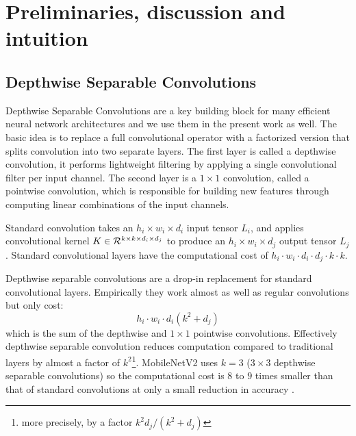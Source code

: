 \documentclass[10pt,twocolumn,letterpaper]{article}
\def\real{{\cal R}}
\begin{document}
\section{Preliminaries, discussion and intuition}

\subsection{Depthwise Separable Convolutions}
Depthwise Separable Convolutions are a key building block for many efficient neural network architectures \cite{MobilenetV1,Chollet_2017_CVPR,ShuffleNet2017} and we use them in the present work as well.
The basic idea is to replace a full convolutional operator with a factorized version that splits convolution into two separate layers.
The first layer is called a depthwise convolution, it performs lightweight filtering by applying a single convolutional filter per input channel.
The second layer is a $1 \times 1$ convolution, called a pointwise convolution, which is responsible for building new features through computing linear combinations of the input channels. 

Standard convolution takes an $h_i\times w_i\times d_i$ input tensor $L_i$, and applies convolutional  kernel $K\in \real^{k\times k \times d_i \times d_j}$ to produce an $h_i\times w_i\times d_j$ output tensor $L_j$.
Standard convolutional layers have the computational cost of $h_i \cdot w_i \cdot d_i \cdot d_j \cdot k \cdot k$. %

Depthwise separable convolutions are a drop-in replacement for standard convolutional layers.
Empirically they work almost as well as regular convolutions but only cost:
\begin{equation}  
  h_i \cdot w_i \cdot d_i (k^2 + d_j)
  \label{eq:depthwise}
\end{equation}
which is the sum of the depthwise and $1 \times 1$ pointwise convolutions.
Effectively depthwise separable convolution reduces computation compared to traditional layers by almost a factor of $k^2$\footnote{more precisely, by a factor $k^2 d_j/(k^2 + d_j)$}.
\mbox{MobileNetV2} uses $k=3$ ($3 \times 3$ depthwise separable convolutions) so the computational cost is $8$ to $9$ times smaller than that of standard convolutions at only a small reduction in accuracy \cite{MobilenetV1}.
\end{document}
